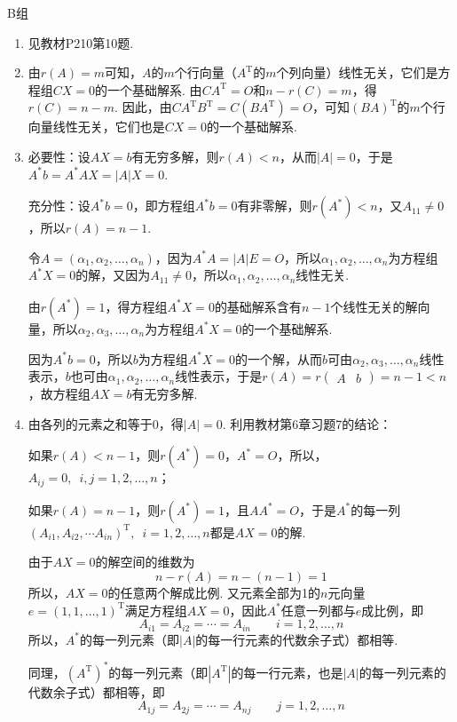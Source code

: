 \centerline{\heiti B组}
\begin{enumerate}
    \item 见教材P210第10题.

    \item 由$r(A)=m$可知，$A$的$m$个行向量（$A^\mathrm{T}$的$m$个列向量）线性无关，它们是方程组$CX=0$的一个基础解系. 由$CA^\mathrm{T}=O$和$n-r(C)=m$，得$r(C)=n-m$. 因此，由$CA^\mathrm{T}B^\mathrm{T}=C(BA^\mathrm{T})=O$，可知$(BA)^\mathrm{T}$的$m$个行向量线性无关，它们也是$CX=0$的一个基础解系.

    \item 必要性：设$AX=b$有无穷多解，则$r(A)<n$，从而$|A|=0$，于是$A^*b=A^*AX=|A|X=0$.

          充分性：设$A^*b=0$，即方程组$A^*b=0$有非零解，则$r(A^*)<n$，又$A_{11}\neq 0$，所以$r(A)=n-1$.

          令$A=(\alpha_1,\alpha_2,\ldots,\alpha_n)$，因为$A^*A=|A|E=O$，所以$\alpha_1,\alpha_2,\ldots,\alpha_n$为方程组$A^*X=0$的解，又因为$A_{11}\neq 0$，所以$\alpha_1,\alpha_2,\ldots,\alpha_n$线性无关.

          由$r(A^*)=1$，得方程组$A^*X=0$的基础解系含有$n-1$个线性无关的解向量，所以$\alpha_2,\alpha_3,\ldots,\alpha_n$为方程组$A^*X=0$的一个基础解系.

          因为$A^*b=0$，所以$b$为方程组$A^*X=0$的一个解，从而$b$可由$\alpha_2,\alpha_3,\ldots,\alpha_n$线性表示，$b$也可由$\alpha_1,\alpha_2,\ldots,\alpha_n$线性表示，于是$r(A) = r\begin{pmatrix}A & b\end{pmatrix}=n-1<n$，故方程组$AX=b$有无穷多解.

    \item 由各列的元素之和等于0，得$|A|=0$. 利用教材第6章习题7的结论：

          如果$r(A)<n-1$，则$r(A^*)=0$，$A^*=O$，所以，$A_{ij}=0,\enspace i,j=1,2,\ldots,n$；

          如果$r(A)=n-1$，则$r(A^*)=1$，且$AA^*=O$，于是$A^*$的每一列$(A_{i1},A_{i2},\cdots A_{in})^\mathrm{T},\enspace i=1,2,\ldots,n$都是$AX=0$的解.

          由于$AX=0$的解空间的维数为
          \[ n-r(A)=n-(n-1)=1 \]
          所以，$AX=0$的任意两个解成比例. 又元素全部为1的$n$元向量$e=(1,1,\ldots,1)^\mathrm{T}$满足方程组$AX=0$，因此$A^*$任意一列都与$e$成比例，即
          \[ A_{i1}=A_{i2}=\cdots=A_{in} \qquad i=1,2,\ldots,n \]
          所以，$A^*$的每一列元素（即$|A|$的每一行元素的代数余子式）都相等.

          同理，$(A^\mathrm{T})^*$的每一列元素（即$|A^\mathrm{T}|$的每一行元素，也是$|A|$的每一列元素的代数余子式）都相等，即
          \[ A_{1j}=A_{2j}=\cdots=A_{nj} \qquad j=1,2,\ldots,n \]


\end{enumerate}
